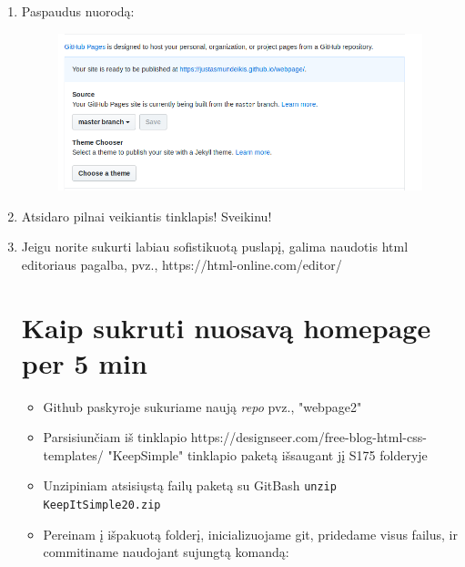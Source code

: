 \documentclass[12pt,a4paper]{article}
\begin{document}
\begin{enumerate}
\item Paspaudus nuorodą:
\begin{figure}[H]
\center
\includegraphics[scale=0.4]{webpage_12.png}
\end{figure}
 
\item Atsidaro pilnai veikiantis tinklapis! Sveikinu!
\begin{figure}[H]
\center
{}
\end{figure}
 
 
\item Jeigu norite sukurti labiau sofistikuotą puslapį, galima naudotis html editoriaus pagalba, pvz., https://html-online.com/editor/


\section{Kaip sukruti nuosavą homepage per 5 min}
\begin{itemize}
\item Github paskyroje sukuriame naują \textit{repo} pvz., "webpage2"
\item Parsisiunčiam iš tinklapio https://designseer.com/free-blog-html-css-templates/ "KeepSimple" tinklapio paketą išsaugant jį S175 folderyje
\item Unzipiniam atsisiųstą failų paketą su GitBash \colorbox{listinggray}{\lstinline|unzip KeepItSimple20.zip|}
\item Pereinam į išpakuotą folderį, inicializuojame git, pridedame visus failus, ir commitiname naudojant sujungtą komandą:


\end{itemize}
\end{enumerate}
\end{document}
